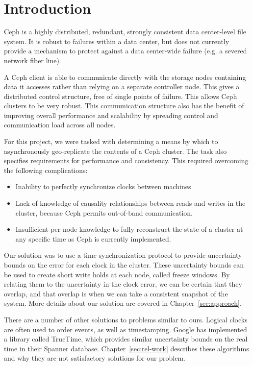 \chapter{Introduction}
\label{sec:introduction}

Ceph is a highly distributed, redundant, strongly consistent data
center-level file system. It is robust to failures within a data
center, but does not currently provide a mechanism to protect against
a data center-wide failure (e.g. a severed network fiber line).

A Ceph client is able to communicate directly with the storage nodes
containing data it accesses rather than relying on a separate
controller node. This gives a distributed control structure, free of
single points of failure. This allows Ceph clusters to be very
robust. This communication structure also has the benefit of improving
overall performance and scalability by spreading control and
communication load across all nodes.

For this project, we were tasked with determining a means by which to
asynchronously geo-replicate the contents of a Ceph cluster. The task
also specifies requirements for performance and consistency. This
required overcoming the following complications:

\begin{itemize} %
\item Inability to perfectly synchronize clocks between machines
\item Lack of knowledge of causality relationships between reads and
  writes in the cluster, because Ceph permits out-of-band
  communication.
\item Insufficient per-node knowledge to fully reconstruct the state
  of a cluster at any specific time as Ceph is currently implemented.
\end{itemize}

Our solution was to use a time synchronization protocol to provide
uncertainty bounds on the error for each clock in the cluster. These
uncertainty bounds can be used to create short write holds at each
node, called freeze windows. By relating them to the uncertainty in
the clock error, we can be certain that they overlap, and that overlap
is when we can take a consistent snapshot of the system. More details
about our solution are covered in Chapter~\ref{sec:approach}.

There are a number of other solutions to problems similar to
ours. Logical clocks are often used to order events, as well as
timestamping. Google has implemented a library called TrueTime, which
provides similar uncertainty bounds on the real time in their Spanner
database. Chapter~\ref{sec:rel-work} describes these algorithms and
why they are not satisfactory solutions for our problem.

